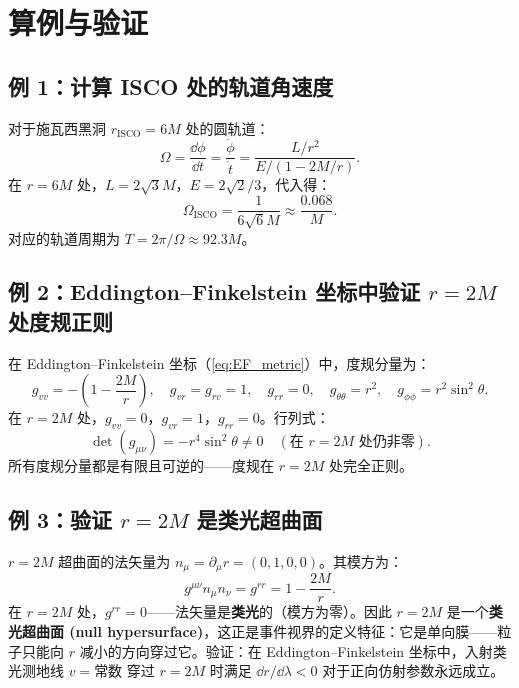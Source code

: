 \section{算例与验证}
\label{sec:examples}

\subsection{例 1：计算 ISCO 处的轨道角速度}

对于施瓦西黑洞 $r_{\text{ISCO}} = 6M$ 处的圆轨道：
\begin{equation}
    \Omega = \frac{\dd\phi}{\dd t} = \frac{\dot\phi}{\dot t} = \frac{L/r^2}{E/(1-2M/r)}.
\end{equation}
在 $r=6M$ 处，$L=2\sqrt{3}M$，$E=2\sqrt{2}/3$，代入得：
\begin{equation}
    \Omega_{\text{ISCO}} = \frac{1}{6\sqrt{6}M} \approx \frac{0.068}{M}.
\end{equation}
对应的轨道周期为 $T = 2\pi/\Omega \approx 92.3M$。

\subsection{例 2：Eddington–Finkelstein 坐标中验证 $r=2M$ 处度规正则}

在 Eddington–Finkelstein 坐标（\ref{eq:EF_metric}）中，度规分量为：
\begin{equation}
    g_{vv} = -\left(1-\frac{2M}{r}\right), \quad g_{vr}=g_{rv}=1, \quad g_{rr}=0, \quad g_{\theta\theta}=r^2, \quad g_{\phi\phi}=r^2\sin^2\theta.
\end{equation}
在 $r=2M$ 处，$g_{vv}=0$，$g_{vr}=1$，$g_{rr}=0$。行列式：
\begin{equation}
    \det(g_{\mu\nu}) = -r^4\sin^2\theta \neq 0 \quad (\text{在 } r=2M \text{ 处仍非零}).
\end{equation}
所有度规分量都是有限且可逆的——度规在 $r=2M$ 处完全正则。

\subsection{例 3：验证 $r=2M$ 是类光超曲面}

$r=2M$ 超曲面的法矢量为 $n_\mu = \partial_\mu r = (0,1,0,0)$。其模方为：
\begin{equation}
    g^{\mu\nu}n_\mu n_\nu = g^{rr} = 1 - \frac{2M}{r}.
\end{equation}
在 $r=2M$ 处，$g^{rr}=0$——法矢量是\textbf{类光}的（模方为零）。因此 $r=2M$ 是一个\textbf{类光超曲面 (null hypersurface)}，这正是事件视界的定义特征：它是单向膜——粒子只能向 $r$ 减小的方向穿过它。验证：在 Eddington–Finkelstein 坐标中，入射类光测地线 $v=\text{常数}$ 穿过 $r=2M$ 时满足 $\dd r/\dd\lambda < 0$ 对于正向仿射参数永远成立。

